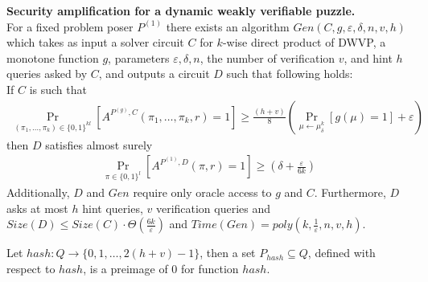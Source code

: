 \begin{theorem}{\textbf{Security amplification for a dynamic weakly verifiable puzzle.}}\\
  For a fixed problem poser $P^{(1)}$ there exists an algorithm $Gen(C, g, \varepsilon, \delta, n, v, h)$ which takes as input a solver circuit $C$ for $k$-wise
  direct product of DWVP, a monotone function $g$, parameters $\varepsilon, \delta,n$, the number of verification $v$, and hint $h$ queries asked by $C$, and outputs a circuit $D$
  such that following holds: \\
  If $C$ is such that \\
  \begin{align*}
    \underset{(\pi_1, \dots, \pi_k) \in \{0,1\}^{kl}}{\Pr}[A^{P^{(g)}, C}(\pi_1, \dots, \pi_k, r) = 1]
    \geq \frac{(h+v)}{8} \left(\underset{\mu \leftarrow \mu_\delta^k}{\Pr}[g(\mu) = 1] + \varepsilon\right)
  \end{align*}
  then $D$ satisfies almost surely
  \begin{align*}
    \underset{\pi \in \{0,1\}^{l}}{\Pr}[A^{P^{(1)},D}(\pi, r) = 1] \geq (\delta + \frac{\varepsilon}{6k})
  \end{align*}
  Additionally, $D$ and $Gen$ require only oracle access to $g$ and $C$. Furthermore, $D$ asks at most $h$ hint queries, $v$ verification queries and
  $Size(D) \leq Size(C) \cdot \Theta(\frac{6k}{\varepsilon})$ and $Time(Gen) = poly(k, \frac{1}{\varepsilon}, n, v, h)$.
\end{theorem}
Let $hash:Q\rightarrow\{0,1,\dots, 2(h+v)-1\}$, then a set $P_{hash} \subseteq Q$, defined with respect to $hash$, is a preimage of $0$ for function $hash$.

